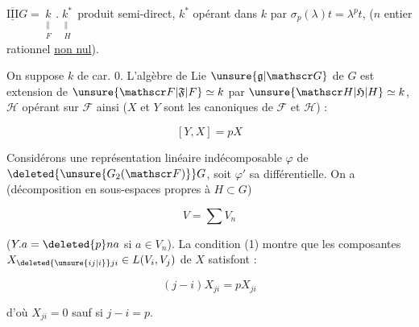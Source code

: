 
$\underline{\overline{\mathrm{III}}}$\quad $G=\underset{\substack{\parallel\\F}}{k}\mathbin{.}\underset{\substack{\parallel\\H}}{k^*}$ produit semi-direct, $k^*$ opérant dans $k$ par $\sigma_p(\lambda)t=\lambda^pt$, ($n$ entier rationnel \uline{non nul}).

On suppose $k$ de car. 0. L'algèbre de Lie  $\unsure{\mathfrak g|\mathscr G}$ de $G$ est extension de $\unsure{\mathscr F|\mathfrak F|F}\simeq k$ par $\unsure{\mathscr H|\mathfrak H|H}\simeq k$, $\mathscr H$ opérant sur $\mathscr F$  ainsi ($X$ et $Y$ sont les  canoniques de $\mathscr F$ et $\mathscr H$) :

\[[Y,X]=pX\tag*{(1)}\]

Considérons une représentation linéaire indécomposable  $\varphi$ de $\deleted{\unsure{G_2(\mathscr F)}}G$, soit $\varphi'$ sa différentielle. On a (décomposition en sous-espaces propres  à $H\subset G$)

\[V=\sum V_n\]

($Y.a=\deleted{p}na$ si $a\in V_n$). La condition (1) montre que les composantes $X_{\deleted{\unsure{ij|i}}ji}\in L(V_i,V_j)$ de $X$ satisfont :

\[(j-i)X_{ji}=pX_{ji}\]

d'où $X_{ji}=0$ sauf si $j-i=p$.

